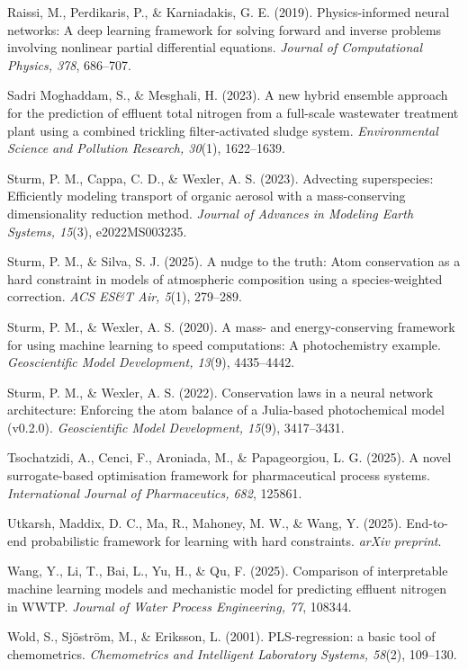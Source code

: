 \documentclass[11pt]{article}
\begin{document}
\noindent Raissi, M., Perdikaris, P., \& Karniadakis, G. E. (2019). Physics-informed neural networks: A deep learning framework for solving forward and inverse problems involving nonlinear partial differential equations. \textit{Journal of Computational Physics, 378}, 686--707.

\noindent Sadri Moghaddam, S., \& Mesghali, H. (2023). A new hybrid ensemble approach for the prediction of effluent total nitrogen from a full-scale wastewater treatment plant using a combined trickling filter-activated sludge system. \textit{Environmental Science and Pollution Research, 30}(1), 1622--1639.

\noindent Sturm, P. M., Cappa, C. D., \& Wexler, A. S. (2023). Advecting superspecies: Efficiently modeling transport of organic aerosol with a mass-conserving dimensionality reduction method. \textit{Journal of Advances in Modeling Earth Systems, 15}(3), e2022MS003235.

\noindent Sturm, P. M., \& Silva, S. J. (2025). A nudge to the truth: Atom conservation as a hard constraint in models of atmospheric composition using a species-weighted correction. \textit{ACS ES\&T Air, 5}(1), 279--289.

\noindent Sturm, P. M., \& Wexler, A. S. (2020). A mass- and energy-conserving framework for using machine learning to speed computations: A photochemistry example. \textit{Geoscientific Model Development, 13}(9), 4435--4442.

\noindent Sturm, P. M., \& Wexler, A. S. (2022). Conservation laws in a neural network architecture: Enforcing the atom balance of a Julia-based photochemical model (v0.2.0). \textit{Geoscientific Model Development, 15}(9), 3417--3431.

\noindent Tsochatzidi, A., Cenci, F., Aroniada, M., \& Papageorgiou, L. G. (2025). A novel surrogate-based optimisation framework for pharmaceutical process systems. \textit{International Journal of Pharmaceutics, 682}, 125861.

\noindent Utkarsh, Maddix, D. C., Ma, R., Mahoney, M. W., \& Wang, Y. (2025). End-to-end probabilistic framework for learning with hard constraints. \textit{arXiv preprint}.

\noindent Wang, Y., Li, T., Bai, L., Yu, H., \& Qu, F. (2025). Comparison of interpretable machine learning models and mechanistic model for predicting effluent nitrogen in WWTP. \textit{Journal of Water Process Engineering, 77}, 108344.

\noindent Wold, S., Sj\"ostr\"om, M., \& Eriksson, L. (2001). PLS-regression: a basic tool of chemometrics. \textit{Chemometrics and Intelligent Laboratory Systems, 58}(2), 109--130.
\end{document}
